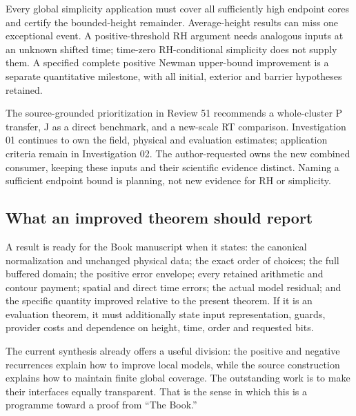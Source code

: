 Every global simplicity application must cover all sufficiently high
endpoint cores and certify the bounded-height remainder. Average-height
results can miss one exceptional event. A positive-threshold RH argument
needs analogous inputs at an unknown shifted time; time-zero
RH-conditional simplicity does not supply them. A specified complete
positive Newman upper-bound improvement is a separate quantitative
milestone, with all initial, exterior and barrier hypotheses retained.

The source-grounded prioritization in Review 51 \cite{target-review}
recommends a whole-cluster P transfer, J as a direct benchmark, and a
new-scale RT comparison. Investigation 01 continues to own the field,
physical and evaluation estimates; application criteria remain in
Investigation 02. The author-requested
owns the new combined consumer, keeping these inputs and their scientific
evidence distinct. Naming a sufficient endpoint bound is
planning, not new evidence for RH or simplicity.

\subsection{What an improved theorem should report}
A result is ready for the Book manuscript when it states: the canonical
normalization and unchanged physical data; the exact order of choices;
the full buffered domain; the positive error envelope; every retained
arithmetic and contour payment; spatial and direct time errors; the
actual model residual; and the specific quantity improved relative to
the present theorem. If it is an evaluation theorem, it must additionally
state input representation, guards, provider costs and dependence on
height, time, order and requested bits.

The current synthesis already offers a useful division: the positive
and negative recurrences explain how to improve local models, while the
source construction explains how to maintain finite global coverage.
The outstanding work is to make their interfaces equally transparent.
That is the sense in which this is a programme toward a proof from
``The Book.''
